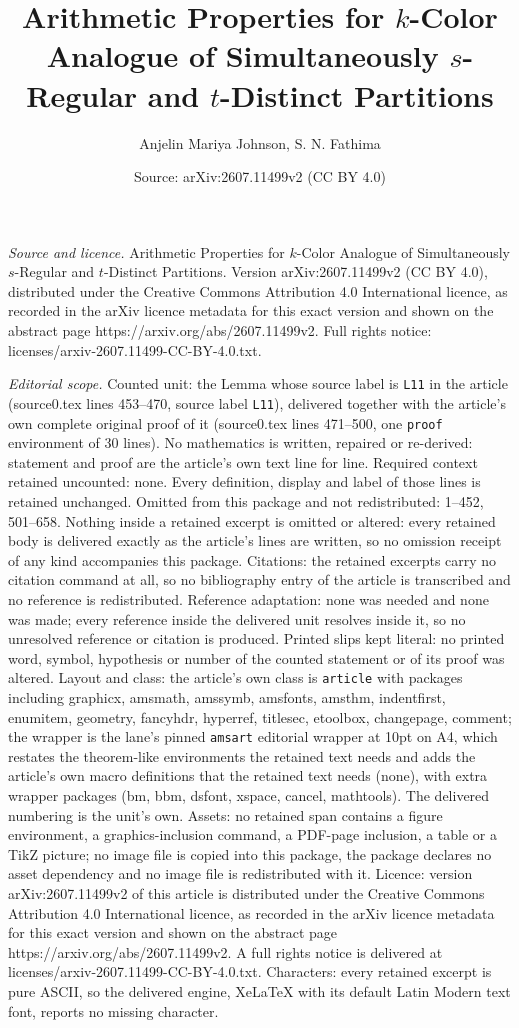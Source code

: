 \documentclass[10pt,a4paper]{amsart}
\title[Arithmetic Properties for $k$-Color Analogue of Simultaneous]{Arithmetic Properties for $k$-Color Analogue of Simultaneously $s$-Regular and $t$-Distinct Partitions}
\author{Anjelin Mariya Johnson, S. N. Fathima}
\date{Source: arXiv:2607.11499v2 (CC BY 4.0)}
\begin{document}
\maketitle

\noindent\emph{Source and licence.} Arithmetic Properties for $k$-Color Analogue of Simultaneously $s$-Regular and $t$-Distinct Partitions. Version arXiv:2607.11499v2 (CC BY 4.0), distributed under the Creative Commons Attribution 4.0 International licence, as recorded in the arXiv licence metadata for this exact version and shown on the abstract page https://arxiv.org/abs/2607.11499v2. Full rights notice: licenses/arxiv-2607.11499-CC-BY-4.0.txt.\par\smallskip

\noindent\textit{Editorial scope.} Counted unit: the Lemma whose source label is \texttt{L11} in the article (source0.tex lines 453--470, source label \texttt{L11}), delivered together with the article's own complete original proof of it (source0.tex lines 471--500, one \texttt{proof} environment of 30 lines). No mathematics is written, repaired or re-derived: statement and proof are the article's own text line for line. Required context retained uncounted: none. Every definition, display and label of those lines is retained unchanged. Omitted from this package and not redistributed: 1--452, 501--658. Nothing inside a retained excerpt is omitted or altered: every retained body is delivered exactly as the article's lines are written, so no omission receipt of any kind accompanies this package. Citations: the retained excerpts carry no citation command at all, so no bibliography entry of the article is transcribed and no reference is redistributed. Reference adaptation: none was needed and none was made; every reference inside the delivered unit resolves inside it, so no unresolved reference or citation is produced. Printed slips kept literal: no printed word, symbol, hypothesis or number of the counted statement or of its proof was altered. Layout and class: the article's own class is \texttt{article} with packages including graphicx, amsmath, amssymb, amsfonts, amsthm, indentfirst, enumitem, geometry, fancyhdr, hyperref, titlesec, etoolbox, changepage, comment; the wrapper is the lane's pinned \texttt{amsart} editorial wrapper at 10pt on A4, which restates the theorem-like environments the retained text needs and adds the article's own macro definitions that the retained text needs (none), with extra wrapper packages (bm, bbm, dsfont, xspace, cancel, mathtools). The delivered numbering is the unit's own. Assets: no retained span contains a figure environment, a graphics-inclusion command, a PDF-page inclusion, a table or a TikZ picture; no image file is copied into this package, the package declares no asset dependency and no image file is redistributed with it. Licence: version arXiv:2607.11499v2 of this article is distributed under the Creative Commons Attribution 4.0 International licence, as recorded in the arXiv licence metadata for this exact version and shown on the abstract page https://arxiv.org/abs/2607.11499v2. A full rights notice is delivered at licenses/arxiv-2607.11499-CC-BY-4.0.txt. Characters: every retained excerpt is pure ASCII, so the delivered engine, XeLaTeX with its default Latin Modern text font, reports no missing character.
\end{document}
